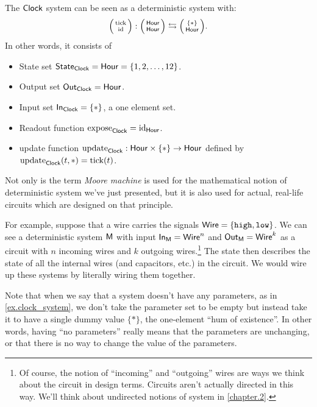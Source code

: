 \documentclass[DynamicalBook]{subfiles}
\begin{document}
\begin{example}\label{ex.clock_system}
  The $\mathsf{Clock}$ system can be seen as a deterministic system with:
  $$\lens{\fun{tick}}{\id} : \lens{\Set{Hour}}{\Set{Hour}} \fromto \lens{\{\ast\}}{\Set{Hour}}.$$
  In other words, it consists of
  \begin{itemize}
  \item State set $\mathsf{State}_{\mathsf{Clock}} = \mathsf{Hour} =\{1,2,\ldots,12\}$.
  \item Output set $\mathsf{Out}_{\mathsf{Clock}} = \mathsf{Hour}$.
  \item Input set $\mathsf{In}_{\mathsf{Clock}} = \{\ast\}$, a one element set.
  \item Readout function $\mathrm{expose}_{\mathsf{Clock}} = \mathrm{id}_{\mathsf{Hour}}$.
  \item update function $\mathrm{update}_{\mathsf{Clock}} : \mathsf{Hour} \times \{\ast\} \to \mathsf{Hour}$
    defined by $\mathrm{update}_{\mathsf{Clock}}(t, \ast) = \mathrm{tick}(t)$.
  \end{itemize}
\end{example}

\begin{example}\label{ex.moore_machine}
  Not only is the term \emph{Moore machine} is used for the mathematical notion of
  deterministic system we've just presented, but it is also used for actual,
  real-life circuits which are designed on that principle.

  For example, suppose that a wire carries the signals $\mathsf{Wire} =
  \{\mathtt{high}, \mathtt{low}\}$. We can see a deterministic system $\mathsf{M}$
  with input $\mathsf{In}_{\mathsf{M}} = \mathsf{Wire}^n$ and $\mathsf{Out}_{\mathsf{M}} = \mathsf{Wire}^k$ as a circuit
  with $n$ incoming wires and $k$ outgoing wires.\footnote{Of course, the notion
  of ``incoming'' and ``outgoing'' wires are ways we think about the circuit in
  design terms. Circuits aren't actually directed in this way. We'll think about
undirected notions of system in \cref{chapter.2}.} The state then describes the
state of all the internal wires (and capacitors, etc.) in the circuit. We would wire up these systems by literally wiring them together. 

\end{example}

Note that when we say that a system doesn't have any parameters, as in \cref{ex.clock_system}, we don't take the
parameter set to be empty but instead take it to have a single dummy value $\{*\}$, the one-element ``hum of existence''. In other words, having ``no parameters'' really means that the parameters are unchanging, or that there is no way to change the value of the parameters.
\end{document}

